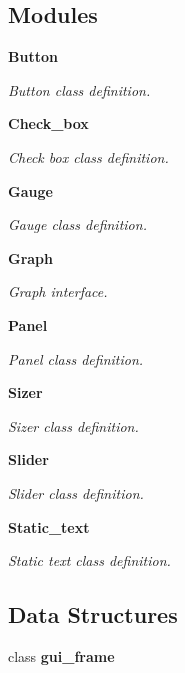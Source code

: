 \subsection*{Modules}
\begin{DoxyCompactItemize}
\item 
\textbf{ Button}
\begin{DoxyCompactList}\small\item\em Button class definition. \end{DoxyCompactList}\item 
\textbf{ Check\+\_\+box}
\begin{DoxyCompactList}\small\item\em Check box class definition. \end{DoxyCompactList}\item 
\textbf{ Gauge}
\begin{DoxyCompactList}\small\item\em Gauge class definition. \end{DoxyCompactList}\item 
\textbf{ Graph}
\begin{DoxyCompactList}\small\item\em Graph interface. \end{DoxyCompactList}\item 
\textbf{ Panel}
\begin{DoxyCompactList}\small\item\em Panel class definition. \end{DoxyCompactList}\item 
\textbf{ Sizer}
\begin{DoxyCompactList}\small\item\em Sizer class definition. \end{DoxyCompactList}\item 
\textbf{ Slider}
\begin{DoxyCompactList}\small\item\em Slider class definition. \end{DoxyCompactList}\item 
\textbf{ Static\+\_\+text}
\begin{DoxyCompactList}\small\item\em Static text class definition. \end{DoxyCompactList}\end{DoxyCompactItemize}
\subsection*{Data Structures}
\begin{DoxyCompactItemize}
\item 
class \textbf{ gui\+\_\+frame}
\end{DoxyCompactItemize}

